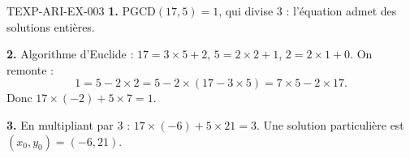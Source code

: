 \begin{corrige}{TEXP-ARI-EX-003}
\textbf{1.} $\mathrm{PGCD}(17,5)=1$, qui divise $3$ : l'équation admet des solutions entières.

\textbf{2.} Algorithme d'Euclide : $17=3\times5+2$, $5=2\times2+1$, $2=2\times1+0$. On remonte :
\[
  1 = 5-2\times2 = 5-2\times(17-3\times5) = 7\times5-2\times17.
\]
Donc $17\times(-2)+5\times7=1$.

\textbf{3.} En multipliant par $3$ : $17\times(-6)+5\times21=3$. Une solution particulière est $(x_0,y_0)=(-6,21)$.
\end{corrige}
